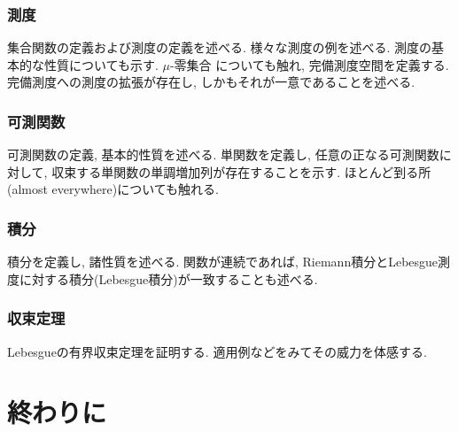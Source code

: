 \documentclass[a4j,dvipdfmx]{jsarticle}
\numberwithin{equation}{section}
\begin{document}
    \section{測度}
        集合関数の定義および測度の定義を述べる. 様々な測度の例を述べる. 測度の基本的な性質についても示す. $\mu$-零集合
        についても触れ, 完備測度空間を定義する. 完備測度への測度の拡張が存在し, しかもそれが一意であることを述べる.
    \clearpage
    \section{可測関数}
        可測関数の定義, 基本的性質を述べる. 単関数を定義し, 任意の正なる可測関数に対して, 収束する単関数の単調増加列が存在することを示す.
        ほとんど到る所(almost everywhere)についても触れる.
    \clearpage
    \section{積分}
        積分を定義し, 諸性質を述べる. 関数が連続であれば, Riemann積分とLebesgue測度に対する積分(Lebesgue積分)が一致することも述べる.
    \clearpage
    \section{収束定理}
        Lebesgueの有界収束定理を証明する. 適用例などをみてその威力を体感する.
    \clearpage
    \part{終わりに}
\end{document}
